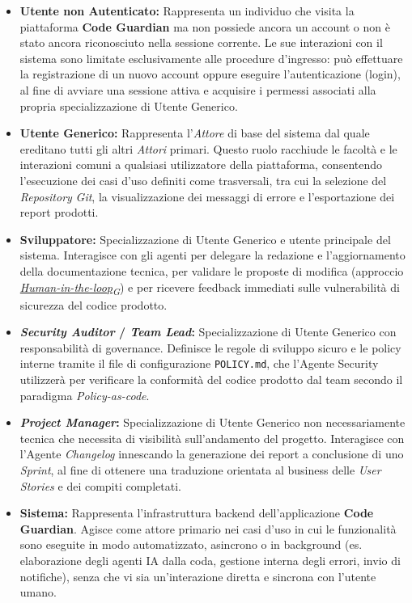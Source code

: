 \documentclass[12pt, a4paper]{article}
\newcommand{\urlglossario}{https://skynetunigroup.github.io/Code_Guardian/Documentazione/PB/glossario_v2.0.0.pdf} %
\newcommand{\glo}[2]{\href{\urlglossario\#nameddest=#2}{#1\textsubscript{G}}}
\begin{document}
\begin{itemize}
    \item \textbf{Utente non Autenticato:} Rappresenta un individuo che visita la piattaforma \textbf{Code Guardian} ma non possiede ancora un account o non è stato ancora riconosciuto nella sessione corrente. Le sue interazioni con il sistema sono limitate esclusivamente alle procedure d'ingresso: può effettuare la registrazione di un nuovo account oppure eseguire l'autenticazione (login), al fine di avviare una sessione attiva e acquisire i permessi associati alla propria specializzazione di Utente Generico.

    \item \textbf{Utente Generico:} Rappresenta l'\textit{Attore} di base del sistema dal quale ereditano tutti gli altri \textit{Attori} primari. Questo ruolo racchiude le facoltà e le interazioni comuni a qualsiasi utilizzatore della piattaforma, consentendo l'esecuzione dei casi d'uso definiti come trasversali, tra cui la selezione del \textit{Repository} \textit{Git}, la visualizzazione dei messaggi di errore e l'esportazione dei report prodotti.
    
    \item \textbf{Sviluppatore:} Specializzazione di Utente Generico e utente principale del sistema. Interagisce con gli agenti per delegare la redazione e l'aggiornamento della documentazione tecnica, per validare le proposte di modifica (approccio \textit{\glo{Human-in-the-loop}{human-in-the-loop}}) e per ricevere feedback immediati sulle vulnerabilità di sicurezza del codice prodotto.
    
    \item \textbf{\textit{Security Auditor} / \textit{Team Lead}:} Specializzazione di Utente Generico con responsabilità di governance. Definisce le regole di sviluppo sicuro e le policy interne tramite il file di configurazione \texttt{POLICY.md}, che l'Agente Security utilizzerà per verificare la conformità del codice prodotto dal team secondo il paradigma \textit{Policy-as-code}.
    
    \item \textbf{\textit{Project Manager}:} Specializzazione di Utente Generico non necessariamente tecnica che necessita di visibilità sull'andamento del progetto. Interagisce con l'Agente \textit{Changelog} innescando la generazione dei report a conclusione di uno \textit{Sprint}, al fine di ottenere una traduzione orientata al business delle \textit{User Stories} e dei compiti completati.

    \item \textbf{Sistema:} Rappresenta l'infrastruttura backend dell'applicazione \textbf{Code Guardian}. Agisce come attore primario nei casi d'uso in cui le funzionalità sono eseguite in modo automatizzato, asincrono o in background (es. elaborazione degli agenti IA dalla coda, gestione interna degli errori, invio di notifiche), senza che vi sia un'interazione diretta e sincrona con l'utente umano.
\end{itemize}
\end{document}
